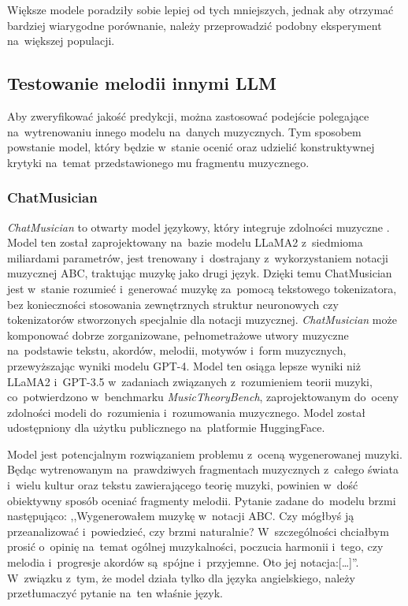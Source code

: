 \documentclass[data-science]{agh-wi} %
\begin{document}
Większe modele poradziły sobie lepiej od tych mniejszych, jednak aby otrzymać bardziej wiarygodne porównanie, należy przeprowadzić podobny eksperyment na~większej populacji.

\subsection{Testowanie melodii innymi LLM}
Aby zweryfikować jakość predykcji, można zastosować podejście polegające na~wytrenowaniu innego modelu na~danych muzycznych. Tym sposobem powstanie model, który będzie w~stanie ocenić oraz udzielić konstruktywnej krytyki na~temat przedstawionego mu fragmentu muzycznego.
\subsubsection*{ChatMusician}
\textit{ChatMusician} to otwarty model językowy, który integruje zdolności muzyczne \cite{yuan2024chatmusician}. Model ten został zaprojektowany na~bazie modelu LLaMA2 z~siedmioma miliardami parametrów, jest trenowany i~dostrajany z~wykorzystaniem notacji muzycznej ABC, traktując muzykę jako drugi język. Dzięki temu ChatMusician jest w~stanie rozumieć i~generować muzykę za~pomocą tekstowego tokenizatora, bez konieczności stosowania zewnętrznych struktur neuronowych czy tokenizatorów stworzonych specjalnie dla notacji muzycznej. \textit{ChatMusician} może komponować dobrze zorganizowane, pełnometrażowe utwory muzyczne na~podstawie tekstu, akordów, melodii, motywów i~form muzycznych, przewyższając wyniki modelu GPT-4. Model ten osiąga lepsze wyniki niż LLaMA2 i~GPT-3.5 w~zadaniach związanych z~rozumieniem teorii muzyki, co~potwierdzono w~benchmarku \textit{MusicTheoryBench}, zaprojektowanym do~oceny zdolności modeli do~rozumienia i~rozumowania muzycznego. Model został udostępniony dla użytku publicznego na~platformie HuggingFace.

Model jest potencjalnym rozwiązaniem problemu z~oceną wygenerowanej muzyki. Będąc wytrenowanym na~prawdziwych fragmentach muzycznych z~całego świata i~wielu kultur oraz tekstu zawierającego teorię muzyki, powinien w~dość obiektywny sposób oceniać fragmenty melodii. Pytanie zadane do~modelu brzmi następująco: ,,Wygenerowałem muzykę w~notacji ABC. Czy mógłbyś ją przeanalizować i~powiedzieć, czy brzmi naturalnie? W~szczególności chciałbym prosić o~opinię na~temat ogólnej muzykalności, poczucia harmonii i~tego, czy melodia i~progresje akordów są~spójne i~przyjemne. Oto jej notacja:[\dots]''. W~związku z~tym, że model działa tylko dla języka angielskiego, należy przetłumaczyć pytanie na~ten właśnie język.
\end{document}
